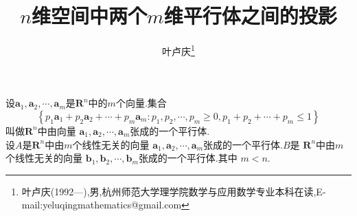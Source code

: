 \documentclass[a4paper]{article}
\begin{document}
\title{\huge{\bf{$n$维空间中两个$m$维平行体之间的投影}}} \author{\small{叶卢庆\footnote{叶卢庆(1992---),男,杭州师范大学理学院数学与应用数学专业本科在读,E-mail:yeluqingmathematics@gmail.com}}}
\maketitle
设$\mathbf{a}_1,\mathbf{a}_2,\cdots,\mathbf{a}_m$是$\mathbf{R}^n$中的$m$个向量.集合
$$\left\{p_1\mathbf{a}_1+p_2\mathbf{a}_2+\cdots+p_m\mathbf{a}_m:p_1,p_2,\cdots,p_m\geq 0,p_1+p_2+\cdots+p_m\leq
1\right\}$$叫做$\mathbf{R}^{n}$中由向量
$\mathbf{a}_1,\mathbf{a}_2,\cdots,\mathbf{a}_m$张成的一个平行体.\\

设$A$是$\mathbf{R}^{n}$中由$m$个线性无关的向量
$\mathbf{a}_1,\mathbf{a}_2,\cdots,\mathbf{a}_m$张成的一个平行体.$B$是
$\mathbf{R}^n$中由$m$个线性无关的向量
$\mathbf{b}_1,\mathbf{b}_2,\cdots,\mathbf{b}_m$张成的一个平行体.其中
$m< n$.\\
\end{document}
